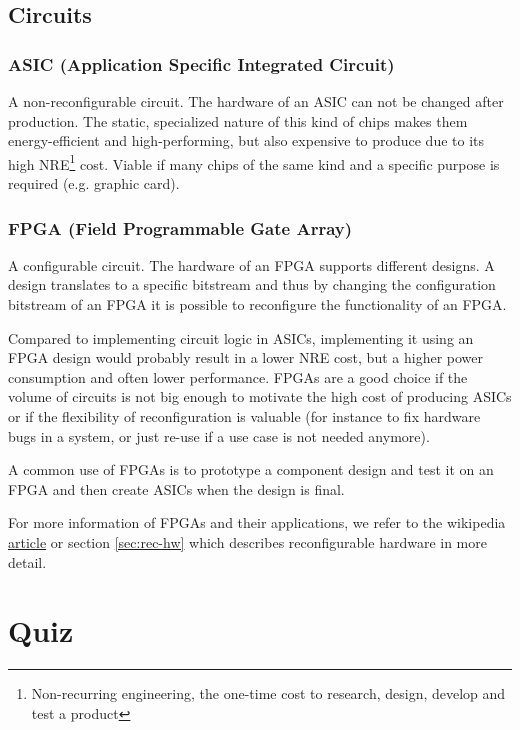 \documentclass{article}
\begin{document}
\subsection{Circuits}
\subsubsection{ASIC (Application Specific Integrated Circuit)}
A non-reconfigurable circuit. The hardware of an ASIC can not be
changed after production. The static, specialized nature of this kind
of chips makes them energy-efficient and high-performing, but also
expensive to produce due to its high NRE\footnote{Non-recurring
  engineering, the one-time cost to research, design, develop and test
  a product} cost. Viable if many chips of the same kind and a
specific purpose is required (e.g. graphic card).

\subsubsection{FPGA (Field Programmable Gate Array)}
A configurable circuit. The hardware of an FPGA supports different
designs. A design translates to a specific bitstream and thus by
changing the configuration bitstream of an FPGA it is possible to
reconfigure the functionality of an FPGA.

Compared to implementing circuit logic in ASICs, implementing it using
an FPGA design would probably result in a lower NRE cost, but a higher
power consumption and often lower performance. FPGAs are a good choice
if the volume of circuits is not big enough to motivate the high cost
of producing ASICs or if the flexibility of reconfiguration is
valuable (for instance to fix hardware bugs in a system, or just
re-use if a use case is not needed anymore).

A common use of FPGAs is to prototype a component design and test it
on an FPGA and then create ASICs when the design is final.

For more information of FPGAs and their applications, we refer to the
wikipedia
\href{https://en.wikipedia.org/wiki/Field-programmable_gate_array#Applications}{article}
or section \ref{sec:rec-hw} which describes reconfigurable hardware in
more detail.
\section{Quiz}
\end{document}
